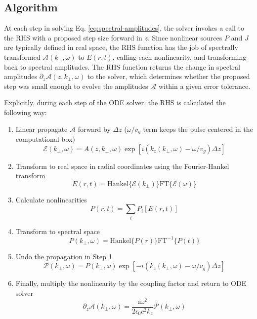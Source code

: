\documentclass{article}
\begin{document}
\subsection{Algorithm}
At each step in solving Eq. \eqref{eq:spectral-amplitudes}, the solver
invokes a call to the RHS with a proposed step size forward in
$z$. Since nonlinear sources $P$ and $J$ are typically defined in real
space, the RHS function has the job of spectrally transformed
$\mathcal{A}(k_\perp,\omega)$ to $E(r, t)$, calling each nonlinearity,
and transforming back to spectral amplitudes. The RHS function returns
the change in spectral amplitudes
$\partial_z \mathcal{A}(z,k_\perp,\omega)$ to the solver, which
determines whether the proposed step was small enough to evolve the
amplitudes $\mathcal{A}$ within a given error tolerance.

Explicitly, during each step of the ODE solver, the RHS is calculated
the following way:
\begin{enumerate}
\item Linear propagate $\mathcal{A}$ forward by $\Delta z$ ($\omega/v_g$ term
  keeps the pulse centered in the computational box)
  \begin{equation}
    \mathcal{E}(k_\perp,\omega) = A(z, k_\perp,\omega) \exp\left[ i\left(k_z\left(k_\perp,\omega\right) - \omega/v_g\right) \Delta z\right]
  \end{equation}
\item Transform to real space in radial coordinates using the Fourier-Hankel transform
  \begin{equation}
    E(r,t) = \mathrm{Hankel}\{\mathcal{E}(k_\perp)\}\mathrm{FT}\{\mathcal{E}(\omega)\}
  \end{equation}
\item Calculate nonlinearities
  \[P(r,t) = \sum_i P_i[E(r,t)]\]
\item Transform to spectral space
  \[P(k_\perp,\omega) = \mathrm{Hankel}\{P(r)\}\mathrm{FT^{-1}}\{P(t)\}\]
\item Undo the propagation in Step 1
  \begin{equation}
    \mathcal{P}(k_\perp,\omega) = P(k_\perp,\omega) \exp\left[ -i(k_z(k_\perp,\omega) - \omega/v_g) \Delta z\right]
  \end{equation}
\item Finally, multiply the nonlinearity by the coupling factor and
  return to ODE solver
  \begin{equation}
    \partial_z \mathcal{A}(k_\perp,\omega) = \frac{i\omega^2}{2\epsilon_0 c^2 k_z} \mathcal{P}(k_\perp,\omega)
  \end{equation}
\end{enumerate}
\end{document}

